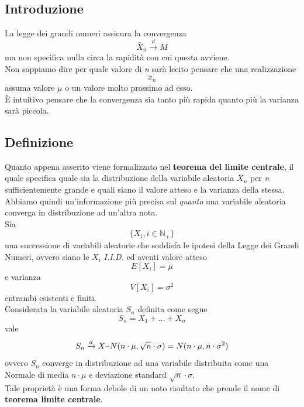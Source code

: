 \subsection{Introduzione}
La legge dei grandi numeri assicura la convergenza
\[
\bar{X}_n \xrightarrow{d} M
\]
ma non specifica nulla circa la rapidità con cui questa avviene.\\
Non sappiamo dire per quale valore di \textit{n} sarà lecito pensare che una realizzazione \[ \bar{x}_n\]
assuma valore $\mu$ o un valore molto prossimo ad esso.\\
È intuitivo pensare che la convergenza sia tanto più rapida quanto più la varianza sarà piccola.

\subsection{Definizione}
Quanto appena asserito viene formalizzato nel \textbf{teorema del limite centrale}, il quale specifica quale sia la distribuzione della variabile aleatoria $\bar{X}_n$ per \textit{n} sufficientemente grande e quali siano il valore atteso e la varianza della stessa.\\
Abbiamo quindi un'informazione più precisa sul \textit{quanto} una variabile aleatoria converga in distribuzione ad un'altra nota.\\
Sia 
\[
\{X_i, i \in \mathbb{N}_+\} 
\]
una successione di variabili aleatorie che soddisfa le ipotesi della Legge dei Grandi Numeri, ovvero siano le $X_i$ \textit{I.I.D.} ed aventi valore atteso
\[
E[X_i] = \mu 
\]
e varianza
\[
V[X_i] = \sigma^2
\]
entrambi esistenti e finiti.\\
Considerata la variabile aleatoria $S_n$ definita come segue
\[
S_n = X_1 + ... + X_n
\]
vale
\begin{equation}
	S_n \xrightarrow{d} X \textapprox N(n \cdot \mu, \sqrt{n} \cdot \sigma) = N(n \cdot \mu, n \cdot \sigma^2)
\end{equation}
ovvero $S_n$ converge in distribuzione ad una variabile distribuita come una Normale
di media $n \cdot \mu$ e deviazione standard $\sqrt{n} \cdot \sigma$.\\
Tale proprietà è una forma debole di un noto risultato che prende il nome di \textbf{teorema limite centrale}.\\

